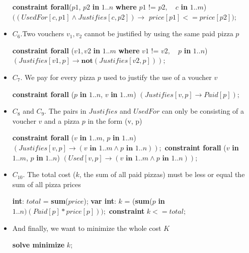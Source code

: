 \documentclass[conference]{IEEEtran}
\newcommand\tab[1][0.3cm]{\hspace*{#1}}
\begin{document}
\begin{itemize}
\begin{algorithmic}
\State \textbf{constraint forall}($p1$, $p2$ \textbf{in} $1..n$ \textbf{where} $p1 \text{ != } p2,$
\State \tab\tab\tab\tab\tab\tab\tab\tab $\text{ } c$ \textbf{in} $1..m$)
\State \tab\tab $((UsedFor[c, p1] \land Justifies[c, p2]) \rightarrow$
\State \tab\tab\tab\tab $price[p1] <= price[p2]);$
\\
\end{algorithmic}
\item $C_6$.Two vouchers $v_1, v_2$ cannot be justified by using the same paid pizza $p$
\begin{algorithmic}
\State \textbf{constraint forall} ($v1, v2$ \textbf{in} $1..m$ \textbf{where} $v1$ != $v2,$
\State \tab\tab\tab\tab\tab\tab\tab\tab $\text{ } p$ \textbf{in} $1..n$)
\State \tab\tab $(Justifies[v1, p] \rightarrow \textbf{not} (Justifies[v2, p]));$
\\
\end{algorithmic}
\item $C_7$. We pay for every pizza $p$ used to justify the use of a voucher $v$
\begin{algorithmic}
\State \textbf{constraint forall} ($p$ \textbf{in} $1..n$, $v$ \textbf{in} $1..m$)
\State \tab\tab $(Justifies[v, p] \rightarrow Paid[p]);$
\\
\end{algorithmic}
\item $C_8$ and $C_9$. The pairs in $Justifies$ and $UsedFor$ can only be consisting of a voucher $v$ and a pizza $p$ in the form (v, p)
\begin{algorithmic}
\State \textbf{constraint forall} ($v$ \textbf{in} $1..m$, $p$ \textbf{in} $1..n$)
\State \tab\tab $(Justifies[v, p] \rightarrow (v \textbf{ in } 1..m \land p \textbf{ in } 1..n));$
\State \textbf{constraint forall} ($v$ \textbf{in} $1..m$, $p$ \textbf{in} $1..n$)
\State \tab\tab $(Used[v, p] \rightarrow (v \textbf{ in } 1..m \land p \textbf{ in } 1..n));$
\\
\end{algorithmic}
\item $C_{10}$. The total cost ($k$, the sum of all paid pizzas) must be less or equal the sum of all pizza prices
\begin{algorithmic}
\State \textbf{int}: $total$ = \textbf{sum}($price$);
\State \textbf{var int}: $k$ = (\textbf{sum}($p$ \textbf{in} $1..n)(Paid[p] * price[p]));$
\State \textbf{constraint} $k <= total;$
\\
\end{algorithmic}
\item And finally, we want to minimize the whole cost $K$
\begin{algorithmic}
\State \textbf{solve minimize} $k$;
\\
\end{algorithmic}
\end{itemize}
\end{document}

